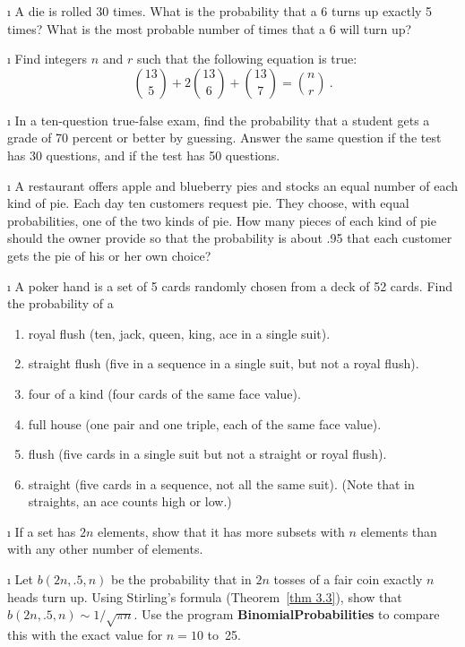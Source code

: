 \begin{LJSItem}
\i\label{exer 3.2.8} A die is rolled 30 times.  What is the probability that a 6
turns up exactly 5 times?  What is the most probable number of times that a 6 will
turn up?

\i\label{exer 3.2.9} Find integers $n$ and $r$ such that the following equation is
true:
$$
 {13 \choose 5} + 2{13 \choose 6} + {13 \choose 7} = {n \choose r}\ .
$$

\i\label{exer 3.2.10} In a ten-question true-false exam, find the probability that
a student gets a grade of 70 percent or better by guessing.   Answer the same question 
if the test has 30 questions, and if the test has 50 questions.

\i\label{exer 3.2.11} A restaurant offers apple and blueberry pies and stocks an
equal number of each kind of pie.  Each day ten customers request pie.  They choose,
with equal probabilities, one of the two kinds of pie.  How many pieces of each kind
of pie should the owner provide so that the probability is about .95 that each
customer gets the pie of his or her own choice?

\i\label{exer 3.2.12} A poker hand is a set of 5 cards randomly chosen from a deck
of 52 cards.  Find the probability of a

\begin{enumerate}
\item royal flush (ten, jack, queen, king, ace in a single suit).

\item straight flush (five in a sequence in a single suit, but not a royal flush).

\item four of a kind (four cards of the same face value).

\item full house (one pair and one triple, each of the same face value).

\item flush (five cards in a single suit but not a straight or royal flush).

\item straight (five cards in a sequence, not all the same suit).
(Note that in straights, an ace counts high or low.)
\end{enumerate}

\i\label{exer 3.2.13} If a set has $2n$ elements, show that it has more subsets
with $n$ elements than with any other number of elements.

\i\label{exer 3.2.14} Let $b(2n,.5,n)$ be the probability that in $2n$ tosses of a
fair coin exactly $n$ heads turn up.  Using Stirling's formula (Theorem~\ref{thm 3.3}), 
show that $b(2n,.5,n)
\sim 1/\sqrt{\pi n}$.  Use the program {\bf BinomialProbabilities} to compare this with
the exact value for $n = 10$ to~25.


\end{LJSItem}
